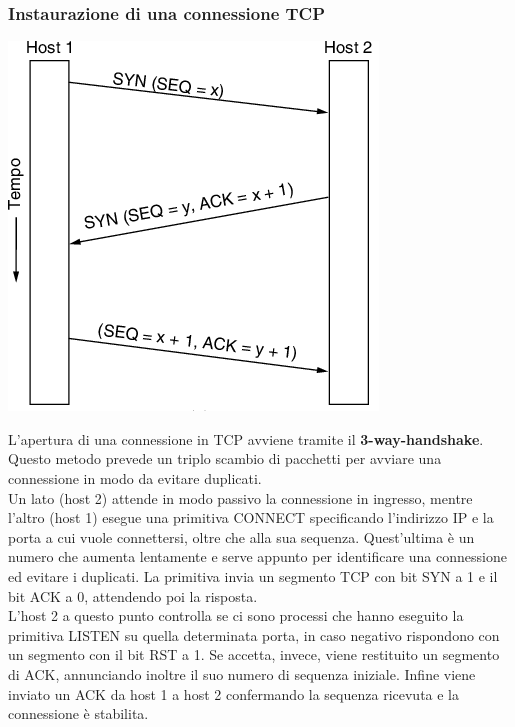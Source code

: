 \documentclass[10pt,a4paper,twoside]{article}
\begin{document}
\subsubsection{Instaurazione di una connessione TCP}
\begin{minipage}{0.3\textwidth}
\begin{center}
\includegraphics[width=\textwidth]{images/handshake.png}
\end{center}
\end{minipage}
\begin{minipage}{0.7\textwidth}
L'apertura di una connessione in TCP avviene tramite il \textbf{3-way-handshake}.\\
Questo metodo prevede un triplo scambio di pacchetti per avviare una connessione in modo da evitare duplicati.\\
Un lato (host 2) attende in modo passivo la connessione in ingresso, mentre l'altro (host 1) esegue una primitiva CONNECT specificando l'indirizzo IP e la porta a cui vuole connettersi, oltre che alla sua sequenza. Quest'ultima è un numero che aumenta lentamente e serve appunto per identificare una connessione ed evitare i duplicati.
La primitiva invia un segmento TCP con bit SYN a 1 e il bit ACK a 0, attendendo poi la risposta.\\
L'host 2 a questo punto controlla se ci sono processi che hanno eseguito la primitiva LISTEN su quella determinata porta, in caso negativo rispondono con un segmento con il bit RST a 1. Se accetta, invece, viene restituito un segmento di ACK, annunciando inoltre il suo numero di sequenza iniziale. Infine viene inviato un ACK da host 1 a host 2 confermando la sequenza ricevuta e la connessione è stabilita.
\end{minipage}
\end{document}
